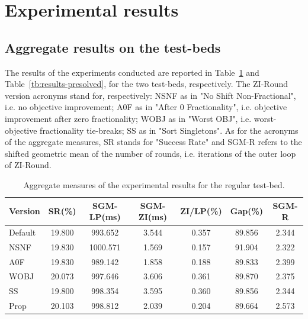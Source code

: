 \documentclass[a4paper,12pt,twoside]{scrbook}
\begin{document}
\section{Experimental results} \label{sec:expresults}

\subsection{Aggregate results on the test-beds}

The results of the experiments conducted are reported in Table~\ref{tb:results-normal} and Table~\ref{tb:results-presolved}, for the two test-beds, respectively. The ZI-Round version acronyms stand for, respectively: NSNF as in "No Shift Non-Fractional", i.e. no objective improvement; A0F as in "After 0 Fractionality", i.e. objective improvement after zero fractionality; WOBJ as in "Worst OBJ", i.e. worst-objective fractionality tie-breaks; SS as in "Sort Singletons". As for the acronyms of the aggregate measures, SR stands for "Success Rate" and SGM-R refers to the shifted geometric mean of the number of rounds, i.e. iterations of the outer loop of ZI-Round. \par
\begin{table}[ht]
	\centering
	\begin{tabular}{@{}lcccccc@{}}
	\toprule
	Version  & SR(\%) & SGM-LP(ms) & SGM-ZI(ms) & ZI/LP(\%) & Gap(\%) & SGM-R \\ \midrule
	Default  & 19.800 & 993.652    & 3.544      & 0.357     & 89.856  & 2.344 \\
	NSNF     & 19.830 & 1000.571   & 1.569      & 0.157     & 91.904  & 2.322 \\
	A0F      & 19.830 & 989.142    & 1.858      & 0.188     & 89.833  & 2.399 \\
	WOBJ     & 20.073 & 997.646    & 3.606      & 0.361     & 89.870  & 2.375 \\
	SS       & 19.800 & 998.354    & 3.595      & 0.360     & 89.856  & 2.344 \\
	Prop     & 20.103 & 998.812    & 2.039      & 0.204     & 89.664  & 2.573 \\ \bottomrule
	\end{tabular}
	\caption{Aggregate measures of the experimental results for the regular test-bed.}
	\label{tb:results-normal}
\end{table}
\end{document}

